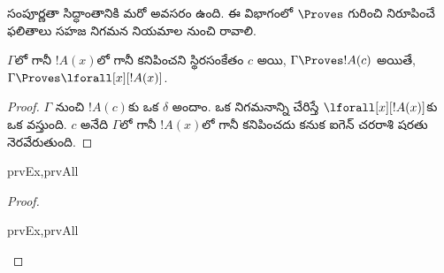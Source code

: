 \documentclass[../../../include/open-logic-section]{subfiles}
\begin{document}


\begin{explain}
  సంపూర్ణతా సిద్ధాంతానికి మరో అవసరం ఉంది. ఈ విభాగంలో $\Proves$ గురించి
  నిరూపించే ఫలితాలు సహజ నిగమన నియమాల నుంచి రావాలి.
\end{explain}

\begin{thm}
 $\Gamma$లో గానీ $!A(x)$లో గానీ
కనిపించని స్థిరసంకేతం $c$ అయి, $\Gamma \Proves !A(c)$ అయితే,
$\Gamma \Proves \lforall[x][!A(x)]$.
\end{thm}

\begin{proof}
$\Gamma$ నుంచి $!A(c)$కు ఒక  $\delta$ అందాం.
ఒక \Intro{\lforall} నిగమనాన్ని చేరిస్తే $\lforall[x][!A(x)]$కు
ఒక  వస్తుంది. $c$ అనేది $\Gamma$లో గానీ $!A(x)$లో
గానీ కనిపించదు కనుక ఐగెన్ చరరాశి షరతు నెరవేరుతుంది.
\end{proof}

\begin{prop}
\begin{tagenumerate}{prvEx,prvAll}

\end{tagenumerate}
\end{prop}

\begin{proof}
\begin{tagenumerate}{prvEx,prvAll}

\end{tagenumerate}
\end{proof}
\end{document}
